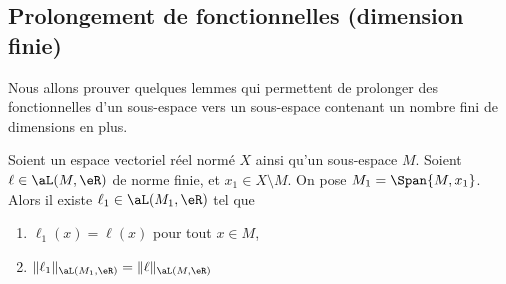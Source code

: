 \subsection{Prolongement de fonctionnelles (dimension finie)}

Nous allons prouver quelques lemmes qui permettent de prolonger des fonctionnelles d'un sous-espace vers un sous-espace contenant un nombre fini de dimensions en plus.

\begin{lemma}     \label{LEMooHWSJooGVmIPV}
	Soient un espace vectoriel réel normé \( X\) ainsi qu'un sous-espace \( M\). Soient \( \ell\in\aL(M,\eR)\) de norme finie, et \( x_1\in X\setminus M\). On pose \( M_1=\Span\{ M, x_1 \}\). Alors il existe \( \ell_1\in\aL(M_1,\eR)\) tel que
	\begin{enumerate}
		\item
		      \( \ell_1(x)=\ell(x)\) pour tout \( x\in M\),
		\item
		      \( \| \ell_1 \|_{\aL(M_1,\eR)}=\| \ell \|_{\aL(M,\eR)}\)
	\end{enumerate}
\end{lemma}

